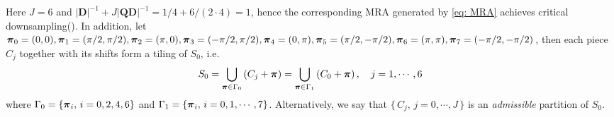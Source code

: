 Here $J= 6$ and $ |\mathbf{D}|^{-1} + J|\mathbf{QD}|^{-1} = 1/4 + 6/ (2\cdot 4) = 1$, hence the corresponding MRA generated by \eqref{eq: MRA} achieves critical downsampling(\cite{durand2007}). 
In addition, let {\small $\boldsymbol{\pi}_0 = (0,0), \boldsymbol{\pi}_1 = (\pi/2,\pi/2), \boldsymbol{\pi}_2 = (\pi,0),\boldsymbol{\pi}_3 = (-\pi/2,\pi/2), \boldsymbol{\pi}_4 = (0,\pi), \boldsymbol{\pi}_5 = (\pi/2,-\pi/2),\boldsymbol{\pi}_6 = (\pi,\pi), \boldsymbol{\pi}_7=(-\pi/2,-\pi/2)$}, then each piece $C_j$ together with its shifts form a tiling of $S_0$, i.e.
\begin{align}\label{eq: tiling}
S_0 = \bigcup_{\boldsymbol{\pi}\in\Gamma_0}\left(C_j + \boldsymbol{\pi}\right) = \bigcup_{\boldsymbol{\pi}\in\Gamma_1}\left(C_0 + \boldsymbol{\pi}\right),\quad j = 1,\cdots,6
\end{align}
where
$\Gamma_0= \{\boldsymbol{\pi}_i,\, i = 0,2,4,6\}$ and 
$\Gamma_1 = \{\boldsymbol{\pi}_i,\, i = 0,1,\cdots,7\}$.
Alternatively, we say that $\{\,C_j,\, j = 0,\cdots,J\,\}$ is an {\it admissible} partition of $S_0$.
